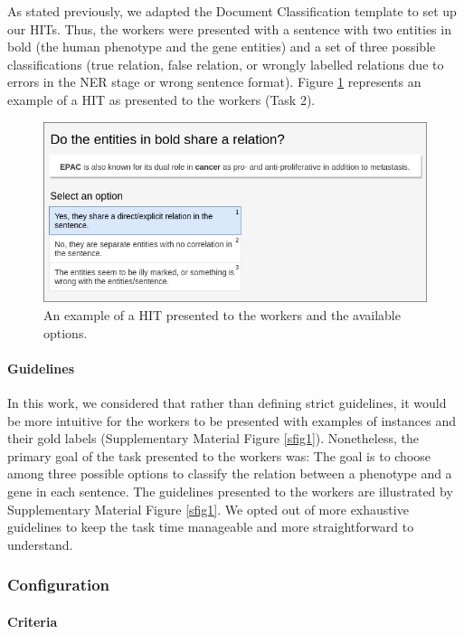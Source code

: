 As stated previously, we adapted the Document Classification template to set up our HITs. Thus, the workers were presented with a sentence with two entities in bold (the human phenotype and the gene entities) and a set of three possible classifications (true relation, false relation, or wrongly labelled relations due to errors in the NER stage or wrong sentence format). Figure \ref{fig2} represents an example of a HIT as presented to the workers (Task 2).

\begin{figure}
\centering
\includegraphics[width=0.8\linewidth]{images/chapter_6/figure_2.jpg}
\caption[HIT Example]{An example of a HIT presented to the workers and the available options.} \label{fig2}
\end{figure}

\paragraph{Guidelines}

In this work, we considered that rather than defining strict guidelines, it would be more intuitive for the workers to be presented with examples of instances and their gold labels (Supplementary Material Figure \ref{sfig1}). Nonetheless, the primary goal of the task presented to the workers was: The goal is to choose among three possible options to classify the relation between a phenotype and a gene in each sentence. The guidelines presented to the workers are illustrated by Supplementary Material Figure \ref{sfig1}. We opted out of more exhaustive guidelines to keep the task time manageable and more straightforward to understand.

\subsubsection{Configuration}

\paragraph{Criteria}

